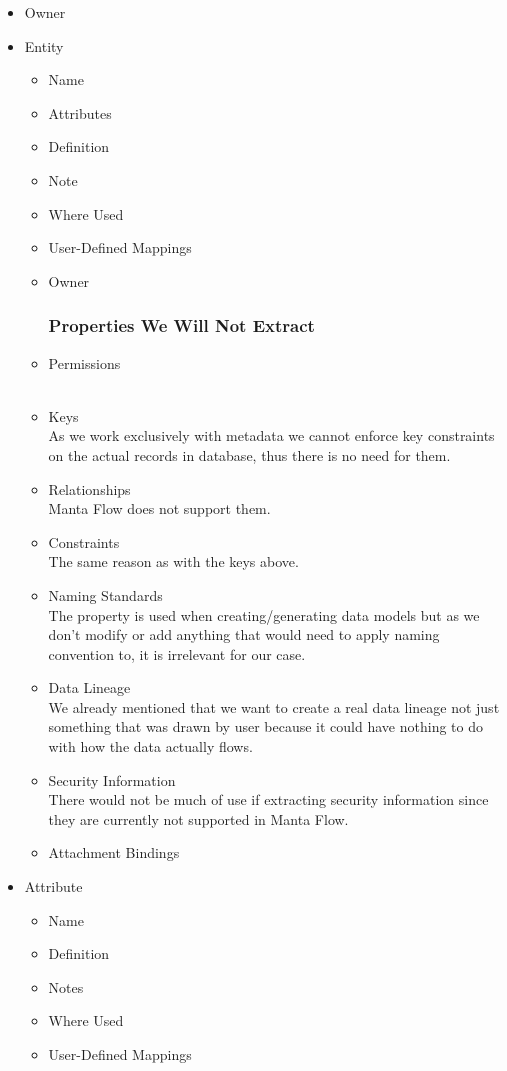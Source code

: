 \documentclass[12pt,a4paper]{report}
\begin{document}
\begin{itemize}
	\item Owner
	\item Entity 
	\begin{itemize}
		\item Name 
		\item Attributes 
		\item Definition
		\item Note
		\item Where Used
		\item User-Defined Mappings
		\item Owner
		\subsubsection{Properties We Will Not Extract}
		\item Permissions \\
		 \\
		\item Keys \\
		As we work exclusively with metadata we cannot enforce key constraints on the actual records in database, thus there is no need for them.
		\item Relationships \\
		Manta Flow does not support them.
		\item Constraints \\
		The same reason as with the keys above.
		\item Naming Standards \\ 
		The property is used when creating/generating data models but as we don't modify or add anything that would need to apply naming convention to, it is irrelevant for our case.
		\item Data Lineage \\
		We already mentioned that we want to create a real data lineage not just something that was drawn by user because it could have nothing to do with how the data actually flows.
		\item Security Information \\
		There would not be much of use if extracting security information since they are currently not supported in Manta Flow.
		\item Attachment Bindings \\
	\end{itemize}
	\item Attribute
	\begin{itemize}
		\item Name
		\item Definition
		\item Notes
		\item Where Used
		\item User-Defined Mappings

\end{itemize}
\end{itemize}
\end{document}
